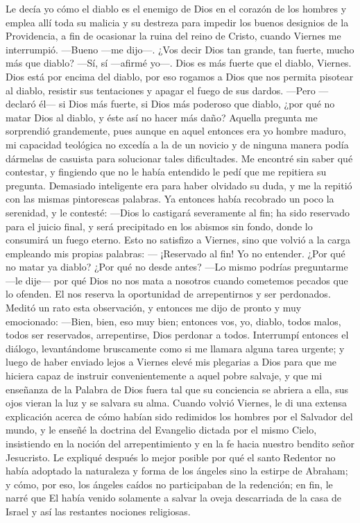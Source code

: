 \documentclass{novela}
\begin{document}
    Le decía yo cómo el diablo es el enemigo de Dios en el corazón de los hombres y emplea allí toda su malicia y su destreza para impedir los buenos designios de la Providencia, a fin de ocasionar la ruina del reino de Cristo, cuando Viernes me interrumpió.
    —Bueno —me dijo—. ¿Vos decir Dios tan grande, tan fuerte, mucho más que diablo?
    —Sí, sí —afirmé yo—. Dios es más fuerte que el diablo, Viernes. Dios está por encima del diablo, por eso rogamos a Dios que nos permita pisotear al diablo, resistir sus tentaciones y apagar el fuego de sus dardos.
    —Pero —declaró él— si Dios más fuerte, si Dios más poderoso que diablo, ¿por qué no matar Dios al diablo, y éste así no hacer más daño?
    Aquella pregunta me sorprendió grandemente, pues aunque en aquel entonces era yo hombre maduro, mi capacidad teológica no excedía a la de un novicio y de ninguna manera podía dármelas de casuista para solucionar tales dificultades.
    Me encontré sin saber qué contestar, y fingiendo que no le había entendido le pedí que me repitiera su pregunta. Demasiado inteligente era para haber olvidado su duda, y me la repitió con las mismas pintorescas palabras. Ya entonces había recobrado un poco la serenidad, y le contesté:
    —Dios lo castigará severamente al fin; ha sido reservado para el juicio final, y será precipitado en los abismos sin fondo, donde lo consumirá un fuego eterno.
    Esto no satisfizo a Viernes, sino que volvió a la carga empleando mis propias palabras:
    — ¡Reservado al fin! Yo no entender. ¿Por qué no matar ya diablo? ¿Por qué no desde antes?
    —Lo mismo podrías preguntarme —le dije— por qué Dios no nos mata a nosotros cuando cometemos pecados que lo ofenden. El nos reserva la oportunidad de arrepentirnos y ser perdonados.
    Meditó un rato esta observación, y entonces me dijo de pronto y muy emocionado:
    —Bien, bien, eso muy bien; entonces vos, yo, diablo, todos malos, todos ser reservados, arrepentirse, Dios perdonar a todos.
    Interrumpí entonces el diálogo, levantándome bruscamente como si me llamara alguna tarea urgente; y luego de haber enviado lejos a Viernes elevé mis plegarias a Dios para que me hiciera capaz de instruir convenientemente a aquel pobre salvaje, y que mi enseñanza de la Palabra de Dios fuera tal que su conciencia se abriera a ella, sus ojos vieran la luz y se salvara su alma. Cuando volvió Viernes, le di una extensa explicación acerca de cómo habían sido redimidos los hombres por el Salvador del mundo, y le enseñé la doctrina del Evangelio dictada por el mismo Cielo, insistiendo en la noción del arrepentimiento y en la fe hacia nuestro bendito señor Jesucristo. Le expliqué después lo mejor posible por qué el santo Redentor no había adoptado la naturaleza y forma de los ángeles sino la estirpe de Abraham; y cómo, por eso, los ángeles caídos no participaban de la redención; en fin, le narré que El había venido solamente a salvar la oveja descarriada de la casa de Israel y así las restantes nociones religiosas.
\end{document}
